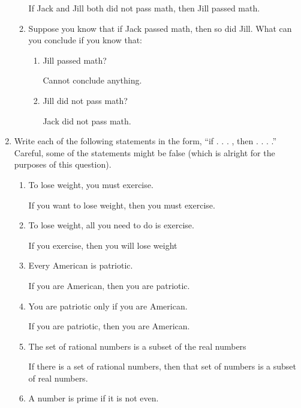 \documentclass[11pt, a4paper]{article}
\newcommand\setItemNumber[1]{\setcounter{enumi}{\numexpr#1-1\relax}}
\begin{document}
\begin{enumerate}
\begin{enumerate}
                If Jack and Jill both did not pass math, then Jill passed math.

            \item Suppose you know that if Jack passed math, then so did Jill. What can you conclude if you know that:
                \begin{enumerate}
                    \item Jill passed math?

                        Cannot conclude anything.

                    \item Jill did not pass math?

                        Jack did not pass math.

                \end{enumerate}
        \end{enumerate}

    \setItemNumber{10}
    \item Write each of the following statements in the form, “if . . . , then . . . .” Careful, some of the statements might be false (which is alright for the purposes of this question).
        \begin{enumerate}
            \item To lose weight, you must exercise.

                If you want to lose weight, then you must exercise.

            \item To lose weight, all you need to do is exercise.

                If you exercise, then you will lose weight

            \item Every American is patriotic.
            
                If you are American, then you are patriotic.

            \item You are patriotic only if you are American.

                If you are patriotic, then you are American.

            \item The set of rational numbers is a subset of the real numbers

                If there is a set of rational numbers, then that set of numbers is a subset of real numbers.

            \item A number is prime if it is not even.


\end{enumerate}
\end{enumerate}
\end{document}
